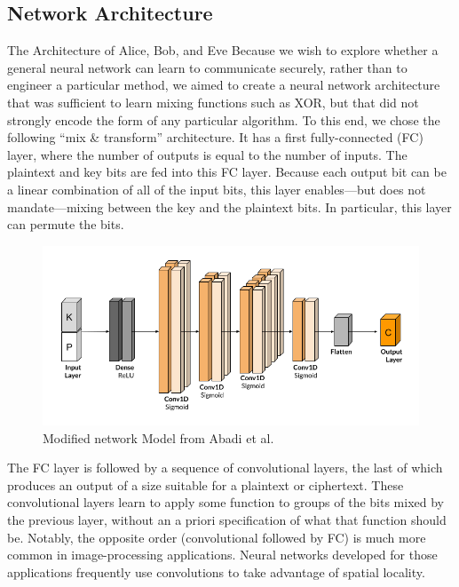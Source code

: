 \documentclass[a4paper]{article}
\begin{document}
    \subsection{Network Architecture} \label{sec:anc_netarch}
    The Architecture of Alice, Bob, and Eve Because we wish to explore whether a general neural
    network can learn to communicate securely, rather than to engineer a particular method, we aimed
    to create a neural network architecture that was sufficient to learn mixing functions such as XOR,
    but that did not strongly encode the form of any particular algorithm.
    To this end, we chose the following “mix \& transform” architecture. It has a first fully-connected
    (FC) layer, where the number of outputs is equal to the number of inputs. The plaintext and key
    bits are fed into this FC layer. Because each output bit can be a linear combination of all of the
    input bits, this layer enables—but does not mandate—mixing between the key and the plaintext bits.
    In particular, this layer can permute the bits.

    \begin{figure}[H]
      \centering
      \includegraphics[width=\textwidth]{../ref/anclayers.png}
      \caption{Modified network Model from Abadi et al.}
      \label{fig:anclayers}
    \end{figure}
    
    The FC layer is followed by a sequence of convolutional
    layers, the last of which produces an output of a size suitable for a plaintext or ciphertext.
    These convolutional layers learn to apply some function to groups of the bits mixed by the previous
    layer, without an a priori specification of what that function should be. Notably, the opposite order
    (convolutional followed by FC) is much more common in image-processing applications. Neural
    networks developed for those applications frequently use convolutions to take advantage of spatial
    locality.  
      
\end{document}

